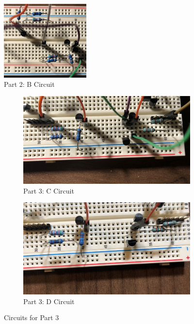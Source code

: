 \documentclass[12pt]{article}
\begin{document}
\begin{figure}[!ht]
    \centering
    \includegraphics[width=0.4\textwidth]{Part2}
    \caption{Part 2: B Circuit}
\end{figure}
\begin{figure}[!ht]
    \centering
    \begin{subfigure}[b]{0.47\textwidth}
        \centering
        \includegraphics[width=\textwidth]{Part3A}
        \caption{Part 3: C Circuit}
    \end{subfigure}
    \begin{subfigure}[b]{0.45\textwidth}
        \centering
        \includegraphics[width=\textwidth]{Part3B}
        \caption{Part 3: D Circuit}
    \end{subfigure}
    \caption{Circuits for Part 3}
\end{figure}
\end{document}
